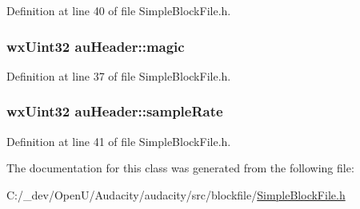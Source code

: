 Definition at line 40 of file Simple\+Block\+File.\+h.

\subsubsection[{\texorpdfstring{magic}{magic}}]{\setlength{\rightskip}{0pt plus 5cm}wx\+Uint32 au\+Header\+::magic}\hypertarget{structau_header_a2308c1a7789da6548bf997f029c831e1}{}\label{structau_header_a2308c1a7789da6548bf997f029c831e1}


Definition at line 37 of file Simple\+Block\+File.\+h.

\subsubsection[{\texorpdfstring{sample\+Rate}{sampleRate}}]{\setlength{\rightskip}{0pt plus 5cm}wx\+Uint32 au\+Header\+::sample\+Rate}\hypertarget{structau_header_a8855c915576fe2514d65d47d6e676f7b}{}\label{structau_header_a8855c915576fe2514d65d47d6e676f7b}


Definition at line 41 of file Simple\+Block\+File.\+h.



The documentation for this class was generated from the following file\+:\begin{DoxyCompactItemize}
\item 
C\+:/\+\_\+dev/\+Open\+U/\+Audacity/audacity/src/blockfile/\hyperlink{_simple_block_file_8h}{Simple\+Block\+File.\+h}\end{DoxyCompactItemize}
